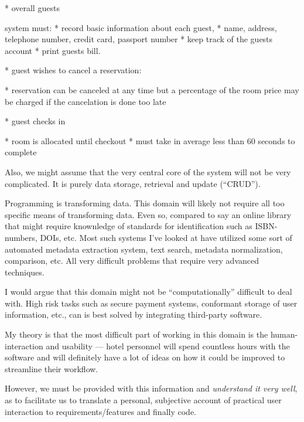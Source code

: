 * overall guests

  system must:
    * record basic information about each guest, 
        * name, address, telephone number, credit card, passport number
    * keep track of the guests account
    * print guests bill.

* guest wishes to cancel a reservation:

    * reservation can be canceled at any time but a percentage of the room
      price may be charged if the cancelation is done too late

* guest checks in

    * room is allocated until checkout
    * must take in average less than 60 seconds to complete

Also, we might assume that the very central core of the system will not be very
complicated. It is purely data storage, retrieval and update (``CRUD'').

Programming is transforming data. This domain will likely not require all too
specific means of transforming data.
Even so, compared to say an online library that might require knownledge of
standards for identification such as ISBN-numbers, DOIs, etc. Most such systems
I've looked at have utilized some sort of automated metadata extraction system,
text search, metadata normalization, comparison, etc. All very difficult
problems that require very advanced techniques.

I would argue that this domain might not be ``computationally'' difficult to
deal with. High risk tasks such as secure payment systems, conformant storage
of user information, etc., can is best solved by integrating third-party
software.

My theory is that the most difficult part of working in this domain is the
human-interaction and usability --- hotel personnel will spend countless hours
with the software and will definitely have a lot of ideas on how it could be
improved to streamline their workflow.

However, we must be provided with this information and \emph{understand it very
well}, as to facilitate us to translate a personal, subjective account of
practical user interaction to requirements/features and finally code.




